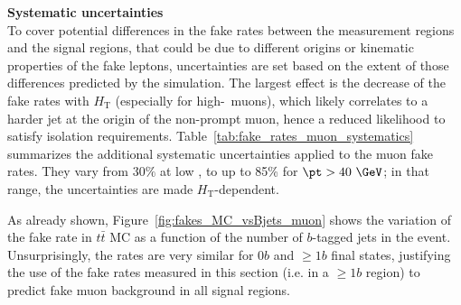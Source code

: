 \begin{table}[htb!]
\def\arraystretch{1.15}
\def\arraystretch{1.15}
\centering
{}
\caption{Additional systematic uncertainty on the muon fake rates, to address variations of the latter in different environments. 
The table also shows the correction factors and uncertainties applied to final states with $\ge 2$ $b$-tagged jets.}
\label{tab:fake_rates_muon_systematics}
\end{table}


\par{\bf Systematic uncertainties\\}
To cover potential differences in the fake rates between the measurement regions and the signal regions, 
that could be due to different origins or kinematic properties of the fake leptons, 
uncertainties are set based on the extent of those differences predicted by the simulation. 
The largest effect is the decrease of the fake rates with $H_\mathrm{T}$ (especially for high-\pt\ muons), 
which likely correlates to a harder jet at the origin of the non-prompt muon, hence a reduced likelihood to satisfy isolation requirements. 
Table~\ref{tab:fake_rates_muon_systematics} summarizes the additional systematic uncertainties applied to the muon fake rates. 
They vary from $30\%$ at low \pt, to up to 85\% for $\pt>40~\GeV$; in that range, the uncertainties are made $H_\mathrm{T}$-dependent. 

As already shown, Figure~\ref{fig:fakes_MC_vsBjets_muon} shows the variation of the fake rate in $t\bar t$ MC as a function of the number of $b$-tagged jets in the event. 
Unsurprisingly, the rates are very similar for $0b$ and $\ge 1b$ final states, 
justifying the use of the fake rates measured in this section (i.e. in a $\ge 1b$ region) to predict fake muon background in all signal regions. 

